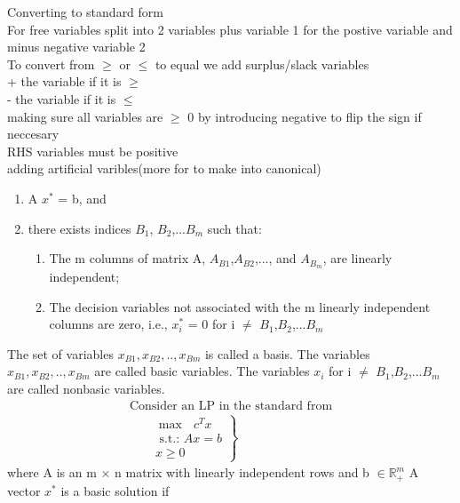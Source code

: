\documentclass{article}
\begin{document}
Converting to standard form\\
For free variables split into 2 variables plus variable 1 for the postive variable and minus negative variable 2\\
To convert from $\geq$ or $\leq$ to equal we add surplus/slack variables\\
+ the variable if it is $\geq$\\
- the variable if it is $\leq$\\
making sure all variables are $\geq$ 0 by introducing negative to flip the sign if neccesary\\
RHS variables must be positive\\
adding artificial varibles(more for to make into canonical)\\

\begin{enumerate}
  \item A $x^*$ = b, and
  \item there exists indices $B_1$, $B_2$,...$B_m$ such that:
  \begin{enumerate}
    \item  The m columns of matrix A, $A_{B1}$,$A_{B2}$,..., and $A_{B_m}$, are linearly independent;
    \item  The decision variables not associated with the m linearly independent columns are zero, i.e., $x_i^*$ = 0 for i $\neq$ $B_1$,$B_2$,...$B_m$
  \end {enumerate}
\end{enumerate}
The set of variables {$x_{B1},x_{B2},..,x_{Bm}$} is called a
basis. The variables $x_{B1},x_{B2},..,x_{Bm}$ are called basic variables. The variables $x_i$ for i $\neq$ $B_1$,$B_2$,...$B_m$ are called nonbasic variables.
$$
\begin{array} { l } { \text { Consider an LP in the standard from } } \\ {\left. \qquad \begin{array} { c } { \max  } { \text{ }} c ^ { T }{ x } \\ { \text { s.t.: } A x = b } \\ { x \geq 0 } \end{array} \right\} } \end{array}
$$
where A is an m $\times$ n matrix with linearly independent rows and b  $\in \mathbb { R } ^ { m}_{+} $ A vector $x^*$ is a basic solution if
\end{document}
